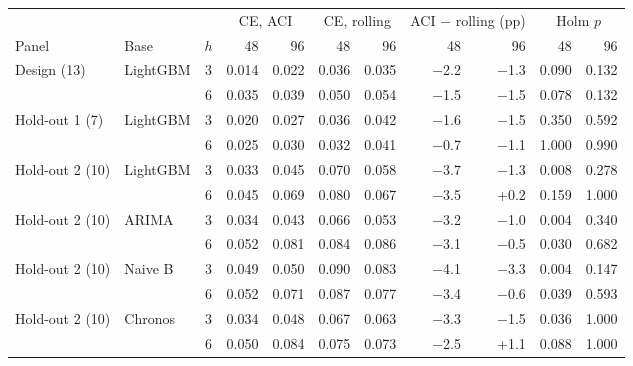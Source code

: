 \begin{tabular}{llcrrrrrrrr}
\toprule
\multicolumn{3}{c}{} & \multicolumn{2}{c}{CE, ACI} & \multicolumn{2}{c}{CE, rolling} & \multicolumn{2}{c}{ACI $-$ rolling (pp)} & \multicolumn{2}{c}{Holm $p$} \\
\cmidrule(lr){4-5}\cmidrule(lr){6-7}\cmidrule(lr){8-9}\cmidrule(lr){10-11}
Panel & Base & $h$ & 48 & 96 & 48 & 96 & 48 & 96 & 48 & 96 \\
\midrule
Design (13) & LightGBM & 3 & 0.014 & 0.022 & 0.036 & 0.035 & $-$2.2 & $-$1.3 & 0.090 & 0.132 \\
 &  & 6 & 0.035 & 0.039 & 0.050 & 0.054 & $-$1.5 & $-$1.5 & 0.078 & 0.132 \\
\midrule
Hold-out 1 (7) & LightGBM & 3 & 0.020 & 0.027 & 0.036 & 0.042 & $-$1.6 & $-$1.5 & 0.350 & 0.592 \\
 &  & 6 & 0.025 & 0.030 & 0.032 & 0.041 & $-$0.7 & $-$1.1 & 1.000 & 0.990 \\
\midrule
Hold-out 2 (10) & LightGBM & 3 & 0.033 & 0.045 & 0.070 & 0.058 & $-$3.7 & $-$1.3 & 0.008 & 0.278 \\
 &  & 6 & 0.045 & 0.069 & 0.080 & 0.067 & $-$3.5 & +0.2 & 0.159 & 1.000 \\
\midrule
Hold-out 2 (10) & ARIMA & 3 & 0.034 & 0.043 & 0.066 & 0.053 & $-$3.2 & $-$1.0 & 0.004 & 0.340 \\
 &  & 6 & 0.052 & 0.081 & 0.084 & 0.086 & $-$3.1 & $-$0.5 & 0.030 & 0.682 \\
\midrule
Hold-out 2 (10) & Naive B & 3 & 0.049 & 0.050 & 0.090 & 0.083 & $-$4.1 & $-$3.3 & 0.004 & 0.147 \\
 &  & 6 & 0.052 & 0.071 & 0.087 & 0.077 & $-$3.4 & $-$0.6 & 0.039 & 0.593 \\
\midrule
Hold-out 2 (10) & Chronos & 3 & 0.034 & 0.048 & 0.067 & 0.063 & $-$3.3 & $-$1.5 & 0.036 & 1.000 \\
 &  & 6 & 0.050 & 0.084 & 0.075 & 0.073 & $-$2.5 & +1.1 & 0.088 & 1.000 \\
\bottomrule
\end{tabular}
